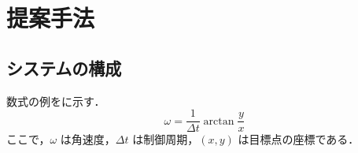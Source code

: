 \chapter{提案手法}
\label{chap:method}

\section{システムの構成}
\label{sec:system}

数式の例をに示す．
\begin{equation}
  \omega = \frac{1}{\Delta t}\arctan\frac{y}{x}
  \label{eq:control}
\end{equation}
ここで，$\omega$ は角速度，$\Delta t$ は制御周期，$(x, y)$ は目標点の座標である．
